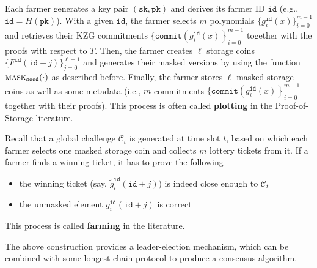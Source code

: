 \documentclass[conference]{IEEEtran}
\newcommand{\sk}{\texttt{sk}}
\newcommand{\pk}{\texttt{pk}}
\newcommand{\id}{\texttt{id}}
\newcommand{\seed}{\texttt{seed}}
\newcommand{\cmt}{\texttt{commit}}
\newcommand{\mask}{\textsc{mask}}
\begin{document}
Each farmer generates a key pair $(\sk, \pk)$ and derives its farmer ID $\id$ (e.g., $\id = H(\pk)$).
With a given $\id$, the farmer selects $m$ polynomials $\{g_i^{\id}(x) \}_{i = 0}^{m - 1}$ and retrieves their KZG commitments $\{\cmt\left(g_i^{\id}(x) \right \}_{i = 0}^{m - 1}$
together with the proofs with respect to $T$. Then, the farmer creates $\ell$ storage coins 
$\{ F^{\id}(\id + j) \}_{j = 0}^{\ell - 1}$ and generates their masked versions by using the function $\mask_{\seed}(\cdot)$ as described before.
Finally, the farmer stores $\ell$ masked storage coins as well as some metadata (i.e., $m$ commitments $\{\cmt\left(g_i^{\id}(x) \right \}_{i = 0}^{m - 1}$ together with their proofs).
This process is often called {\bf plotting} in the Proof-of-Storage literature.

Recall that a global challenge $\mathcal{C}_t$ is generated at time slot $t$, based on which each farmer selects one masked storage coin and collects $m$ lottery tickets from it. If a farmer finds a winning ticket, it has to prove the following
\begin{itemize}
    \item the winning ticket (say, $\tilde{g}_i^{\id}(\id + j)$) is indeed close enough to $\mathcal{C}_t$
    \item the unmasked element ${g}_i^{\id}(\id + j)$ is correct
\end{itemize}
This process is called {\bf farming} in the literature. 

The above construction provides a leader-election mechanism, which can be combined with some longest-chain protocol to produce a consensus algorithm.

\end{document}
